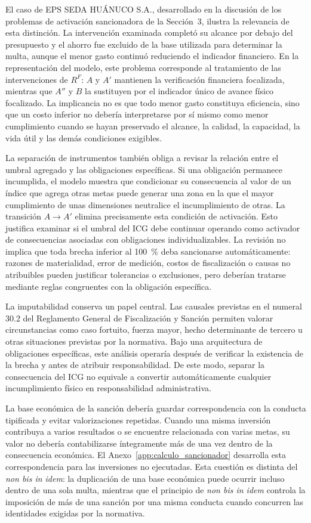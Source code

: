 El caso de EPS SEDA HUÁNUCO S.A., desarrollado en la discusión de los problemas de activación sancionadora de la Sección~3, ilustra la relevancia de esta distinción. La intervención examinada completó su alcance por debajo del presupuesto y el ahorro fue excluido de la base utilizada para determinar la multa, aunque el menor gasto continuó reduciendo el indicador financiero. En la representación del modelo, este problema corresponde al tratamiento de las intervenciones de \(R^{F}\): \(A\) y \(A'\) mantienen la verificación financiera focalizada, mientras que \(A''\) y \(B\) la sustituyen por el indicador único de avance físico focalizado. La implicancia no es que todo menor gasto constituya eficiencia, sino que un costo inferior no debería interpretarse por sí mismo como menor cumplimiento cuando se hayan preservado el alcance, la calidad, la capacidad, la vida útil y las demás condiciones exigibles.

La separación de instrumentos también obliga a revisar la relación entre el umbral agregado y las obligaciones específicas. Si una obligación permanece incumplida, el modelo muestra que condicionar su consecuencia al valor de un índice que agrega otras metas puede generar una zona en la que el mayor cumplimiento de unas dimensiones neutralice el incumplimiento de otras. La transición \(A\rightarrow A'\) elimina precisamente esta condición de activación. Esto justifica examinar si el umbral del ICG debe continuar operando como activador de consecuencias asociadas con obligaciones individualizables. La revisión no implica que toda brecha inferior al 100~\% deba sancionarse automáticamente: razones de materialidad, error de medición, costos de fiscalización o causas no atribuibles pueden justificar tolerancias o exclusiones, pero deberían tratarse mediante reglas congruentes con la obligación específica.

La imputabilidad conserva un papel central. Las causales previstas en el numeral 30.2 del Reglamento General de Fiscalización y Sanción permiten valorar circunstancias como caso fortuito, fuerza mayor, hecho determinante de tercero u otras situaciones previstas por la normativa. Bajo una arquitectura de obligaciones específicas, este análisis operaría después de verificar la existencia de la brecha y antes de atribuir responsabilidad. De este modo, separar la consecuencia del ICG no equivale a convertir automáticamente cualquier incumplimiento físico en responsabilidad administrativa.

La base económica de la sanción debería guardar correspondencia con la conducta tipificada y evitar valorizaciones repetidas. Cuando una misma inversión contribuya a varios resultados o se encuentre relacionada con varias metas, su valor no debería contabilizarse íntegramente más de una vez dentro de la consecuencia económica. El Anexo~\ref{app:calculo_sancionador} desarrolla esta correspondencia para las inversiones no ejecutadas. Esta cuestión es distinta del \textit{non bis in idem}: la duplicación de una base económica puede ocurrir incluso dentro de una sola multa, mientras que el principio de \textit{non bis in idem} controla la imposición de más de una sanción por una misma conducta cuando concurren las identidades exigidas por la normativa.

